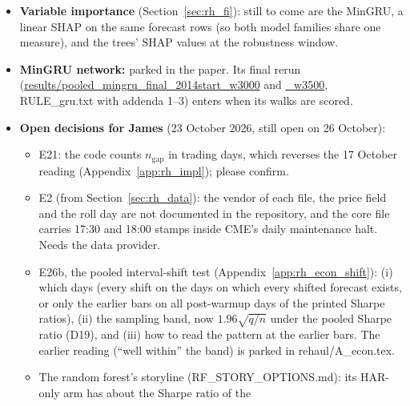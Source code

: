 \begin{itemize}
  across windows while the every-bar gain does not. The body must say how the window was chosen, and the appendix
  reports every window.
\item \textbf{Variable importance} (Section~\ref{sec:rh_fi}): still to come are the MinGRU, a linear SHAP on the same
  forecast rows (so both model families share one measure), and the trees' SHAP values at the robustness window.
\item \textbf{MinGRU network:} parked in the paper. Its final rerun (\url{results/pooled_mingru_final_2014start_w3000}
  and \url{_w3500}, RULE\_gru.txt with addenda 1--3) enters when its walks are scored.
\item \textbf{Open decisions for James} (23 October 2026, still open on 26 October):
  \begin{itemize}
  \item E21: the code counts $n_{\mathrm{gap}}$ in trading days, which reverses the 17 October reading
    (Appendix~\ref{app:rh_impl}); please confirm.
  \item E2 (from Section~\ref{sec:rh_data}): the vendor of each file, the price field and the roll day are not
    documented in the repository, and the core file carries 17:30 and 18:00 stamps inside CME's daily maintenance
    halt. Needs the data provider.
  \item E26b, the pooled interval-shift test (Appendix~\ref{app:rh_econ_shift}): (i) which days (every shift on the
    days on which every shifted forecast exists, or only the earlier bars on all post-warmup days of the printed
    Sharpe ratios), (ii) the sampling band, now $1.96\sqrt{q/n}$ under the pooled Sharpe ratio (D19), and (iii) how
    to read the pattern at the earlier bars. The earlier reading (``well within'' the band) is parked in
    rehaul/A\_econ.tex.
  \item The random forest's storyline (RF\_STORY\_OPTIONS.md): its HAR-only arm has about the Sharpe ratio of the

\end{itemize}
\end{itemize}
